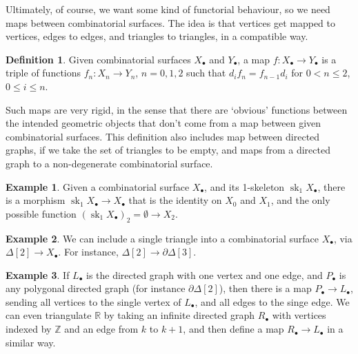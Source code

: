 \documentclass{tufte-handout}
\def\RR{\mathbb{R}}
\def\ZZ{\mathbb{Z}}
\newcommand{\lecturenum}[1]{\marginnote{\color{red}Lecture #1}}
\DeclareMathOperator{\sk}{sk}
\theoremstyle{definition}
\newtheorem{definition}{Definition}
\newtheorem{example}{Example}
\begin{document}
Ultimately,\lecturenum{22} of course, we want some kind of functorial behaviour, so we need
maps between combinatorial surfaces. The idea is that vertices get mapped to vertices, edges
to edges, and triangles to triangles, in a compatible way.

\begin{definition}
Given combinatorial surfaces $X_\bullet$ and $Y_\bullet$, a map $f\colon X_\bullet\to Y_\bullet$ 
is a triple of functions $f_n\colon X_n\to Y_n$, $n=0,1,2$ such that $d_if_n = f_{n-1}d_i$ for $0<n\leq 2$, $0\leq i \leq n$.
\end{definition}

Such maps are very rigid, in the sense that there are `obvious' functions between the intended
geometric objects that don't come from a map between given combinatorial surfaces. This
definition also includes map between directed graphs, if we take the set of triangles
to be empty, and maps from a directed graph to a non-degenerate combinatorial surface.

\begin{example}
Given a combinatorial surface $X_\bullet$, and its 1-skeleton $\sk_1 X_\bullet$, there is a morphism
$\sk_1X_\bullet\to X_\bullet$ that is the identity on $X_0$ and $X_1$, and the only possible 
function $(\sk_1X_\bullet)_2 = \emptyset \to X_2$. 
\end{example}

\begin{example}
We can include a single triangle into a combinatorial surface $X_\bullet$, via 
$\Delta[2] \to X_\bullet$. For instance, $\Delta[2] \to \partial\Delta[3]$.
\end{example}

\begin{example}
If $L_\bullet$ is the directed graph with one vertex and one edge, and $P_\bullet$ is any
polygonal 
directed graph (for instance $\partial\Delta[2]$), then there is a map
$P_\bullet \to L_\bullet$, sending all vertices to the single vertex of $L_\bullet$, and
all edges to the singe edge. We can even triangulate $\RR$ by taking an infinite directed 
graph $R_\bullet$  with vertices indexed by $\ZZ$ and an edge from $k$ to $k+1$, and then
define a map $R_\bullet \to L_\bullet$ in a similar way.
\end{example}
\end{document}
